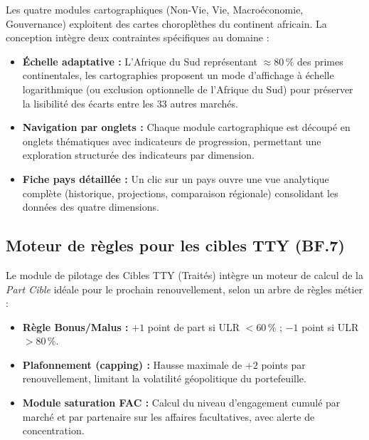 \documentclass[12pt,a4paper]{report}
\begin{document}
Les quatre modules cartographiques (Non-Vie, Vie, Macroéconomie, Gouvernance) exploitent des cartes choroplèthes du continent africain. La conception intègre deux contraintes spécifiques au domaine :

\begin{itemize}[leftmargin=1.5cm, itemsep=3pt]
  \item \textbf{Échelle adaptative :} L'Afrique du Sud représentant $\approx80\,\%$ des primes continentales, les cartographies proposent un mode d'affichage à échelle logarithmique (ou exclusion optionnelle de l'Afrique du Sud) pour préserver la lisibilité des écarts entre les 33 autres marchés.
  \item \textbf{Navigation par onglets :} Chaque module cartographique est découpé en onglets thématiques avec indicateurs de progression, permettant une exploration structurée des indicateurs par dimension.
  \item \textbf{Fiche pays détaillée :} Un clic sur un pays ouvre une vue analytique complète (historique, projections, comparaison régionale) consolidant les données des quatre dimensions.
\end{itemize}

\subsection{Moteur de règles pour les cibles TTY (BF.7)}

Le module de pilotage des Cibles TTY (Traités) intègre un moteur de calcul de la \textit{Part Cible} idéale pour le prochain renouvellement, selon un arbre de règles métier :

\begin{itemize}[leftmargin=1.5cm, itemsep=3pt]
  \item \textbf{Règle Bonus/Malus :} $+1$ point de part si ULR $< 60\,\%$ ; $-1$ point si ULR $> 80\,\%$.
  \item \textbf{Plafonnement (capping) :} Hausse maximale de $+2$ points par renouvellement, limitant la volatilité géopolitique du portefeuille.
  \item \textbf{Module saturation FAC :} Calcul du niveau d'engagement cumulé par marché et par partenaire sur les affaires facultatives, avec alerte de concentration.
\end{itemize}
\end{document}
